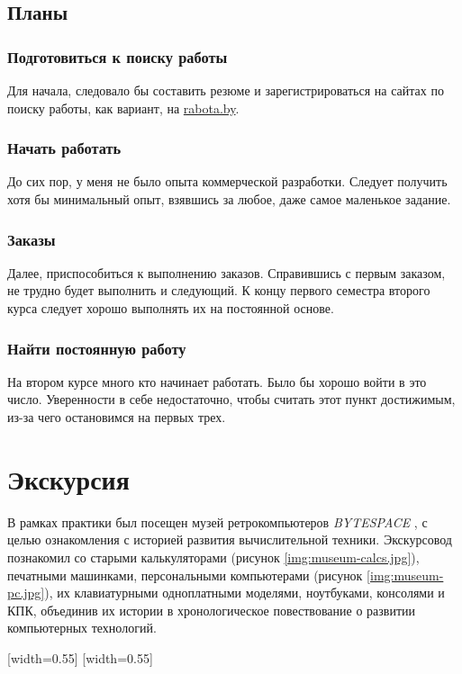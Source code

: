 \documentclass[variant=practice]{bsuir}
\begin{document}
\section{Планы}

\subsection{Подготовиться к поиску работы} Для начала, следовало бы составить
резюме и зарегистрироваться на сайтах по поиску работы, как вариант, на
\url{rabota.by}.

\subsection{Начать работать} До сих пор, у меня не было опыта коммерческой
разработки. Следует получить хотя бы минимальный опыт, взявшись за любое, даже
самое маленькое задание.

\subsection{Заказы} Далее, приспособиться к выполнению заказов.
Справившись с первым заказом, не трудно будет выполнить и следующий. К концу
первого семестра второго курса следует хорошо выполнять их на постоянной основе.

\subsection{Найти постоянную работу} На втором курсе много кто начинает
работать. Было бы хорошо войти в это число. Уверенности в себе недостаточно,
чтобы считать этот пункт достижимым, из-за чего остановимся на первых трех.

\chapter{Экскурсия}

В рамках практики был посещен музей ретрокомпьютеров \textit{BYTESPACE}
, с целью ознакомления с историей
развития вычислительной техники. Экскурсовод познакомил со старыми
калькуляторами (рисунок \ref{img:museum-calcs.jpg}), печатными машинками,
персональными компьютерами (рисунок \ref{img:museum-pc.jpg}), их клавиатурными
одноплатными моделями, ноутбуками, консолями и КПК, объединив их истории в
хронологическое повествование о развитии компьютерных технологий.

[width=0.55\textwidth]
[width=0.55\textwidth]
\end{document}
